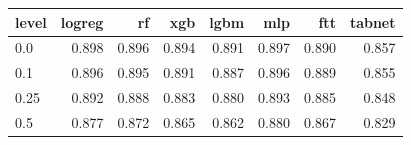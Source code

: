\begin{tabular}{lrrrrrrr}
\toprule
level & logreg & rf & xgb & lgbm & mlp & ftt & tabnet \\
\midrule
0.0 & 0.898 & 0.896 & 0.894 & 0.891 & 0.897 & 0.890 & 0.857 \\
0.1 & 0.896 & 0.895 & 0.891 & 0.887 & 0.896 & 0.889 & 0.855 \\
0.25 & 0.892 & 0.888 & 0.883 & 0.880 & 0.893 & 0.885 & 0.848 \\
0.5 & 0.877 & 0.872 & 0.865 & 0.862 & 0.880 & 0.867 & 0.829 \\
\bottomrule
\end{tabular}
